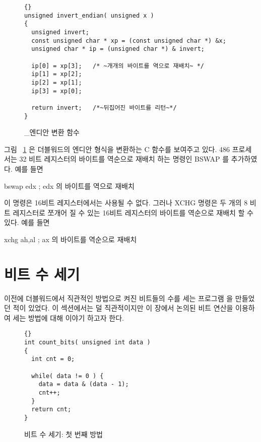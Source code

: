 \begin{figure}[t]
\begin{lstlisting}[frame=tlrb, escapeinside=~~]{}
unsigned invert_endian( unsigned x )
{
  unsigned invert;
  const unsigned char * xp = (const unsigned char *) &x;
  unsigned char * ip = (unsigned char *) & invert;

  ip[0] = xp[3];   /* ~개개의 바이트를 역으로 재배치~ */
  ip[1] = xp[2];
  ip[2] = xp[1];
  ip[3] = xp[0];

  return invert;   /*~뒤집어진 바이트를 리턴~*/
}
\end{lstlisting}
\caption{\_엔디안 변환 함수\label{fig:invertEndian}}
\end{figure}

그림 ~\ref{fig:invertEndian} 은 더블워드의 엔디안 형식을 변환하는 C 함수를
보여주고 있다. 486 프로세서는 32 비트 레지스터의 바이트를 역순으로
재배치 하는 명령인 {\code BSWAP} 를 추가하였다. 예를 들면

\begin{AsmCodeListing}[frame=none,numbers=none]
      bswap   edx          ; edx 의 바이트를 역으로 재배치
\end{AsmCodeListing}
이 명령은 16비트 레지스터에서는 사용될 수 없다. 그러나 {\code XCHG}
 명령은 두 개의 8 비트 레지스터로 쪼개어 질 수 있는 
16비트 레지스터의 바이트를 역순으로 재배치 할 수 있다. 예를 들면

\begin{AsmCodeListing}[frame=none,numbers=none]
      xchg    ah,al        ; ax 의 바이트를 역순으로 재배치
\end{AsmCodeListing}

\section{비트 수 세기}

이전에 더블워드에서 직관적인 방법으로 켜진 비트들의 수를 세는 프로그램
을 만들었던 적이 있었다. 이 섹션에서는 덜 직관적이지만 이 장에서 논의된
비트 연산을 이용하여 세는 방법에 대해 이야기 하고자 한다. 

\begin{figure}[t]
\begin{lstlisting}[frame=tblr]{}
int count_bits( unsigned int data )
{
  int cnt = 0;

  while( data != 0 ) {
    data = data & (data - 1);
    cnt++;
  }
  return cnt;
}
\end{lstlisting}
\caption{비트 수 세기: 첫 번째 방법 \label{fig:meth1}}
\end{figure}

